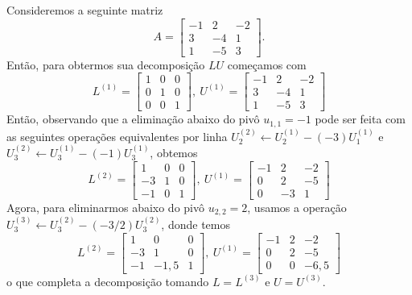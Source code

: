 \begin{ex}\label{ex:lu}
  Consideremos a seguinte matriz
  \begin{equation}
    A =
    \begin{bmatrix}
      -1 & 2 & -2\\
      3 & -4 & 1\\
      1 & -5 & 3
    \end{bmatrix}.
  \end{equation}
  Então, para obtermos sua decomposição $LU$ começamos com
  \begin{equation}
    L^{(1)} =
    \begin{bmatrix}
      1 & 0 & 0\\
      0 & 1 & 0\\
      0 & 0 & 1
    \end{bmatrix}, ~
    U^{(1)} =
    \begin{bmatrix}
      -1 & 2 & -2\\
      3 & -4 & 1\\
      1 & -5 & 3
    \end{bmatrix}
  \end{equation}
  Então, observando que a eliminação abaixo do pivô $u_{1,1}=-1$ pode ser feita com as seguintes operações equivalentes por linha $U_2^{(2)} \leftarrow U_2^{(1)} - (-3)U_1^{(1)}$ e $U_3^{(2)} \leftarrow U_3^{(1)} - (-1)U_3^{(1)}$, obtemos
  \begin{equation}
    L^{(2)} =
    \begin{bmatrix}
      1 & 0 & 0\\
      -3 & 1 & 0\\
      -1 & 0 & 1
    \end{bmatrix}, ~
    U^{(1)} =
    \begin{bmatrix}
      -1 & 2 & -2\\
      0 & 2 & -5\\
      0 & -3 & 1
    \end{bmatrix}
  \end{equation}
  Agora, para eliminarmos abaixo do pivô $u_{2,2}=2$, usamos a operação $U_3^{(3)} \leftarrow U_3^{(2)} - (-3/2)U_3^{(2)}$, donde temos
  \begin{equation}
    L^{(2)} =
    \begin{bmatrix}
      1 & 0 & 0\\
      -3 & 1 & 0\\
      -1 & -1,5 & 1
    \end{bmatrix}, ~
    U^{(1)} =
    \begin{bmatrix}
      -1 & 2 & -2\\
      0 & 2 & -5\\
      0 & 0 & -6,5
    \end{bmatrix}
  \end{equation}
o que completa a decomposição tomando $L = L^{(3)}$ e $U = U^{(3)}$.

% 
\end{ex}

